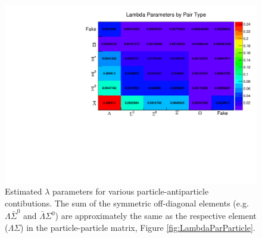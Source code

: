\begin{figure}[hbt]
\includegraphics[width=36pc]{Figures/YieldAndEff/2016-08-12-LambdaParamsParticleAntiparticle.pdf}
\caption[Particle-antiparticle $\lambda$ parameters]{
Estimated $\lambda$ parameters for various particle-antiparticle contibutions. The sum of the symmetric off-diagonal elements (e.g.\ $\Lambda\bar{\Sigma}^0$ and $\bar{\Lambda}\Sigma^0$) are approximately the same as the respective element ($\Lambda\Sigma$) in the particle-particle matrix, Figure \ref{fig:LambdaParParticle}.
}
\label{fig:LambdaParParticleAntiparticle}
\end{figure}

